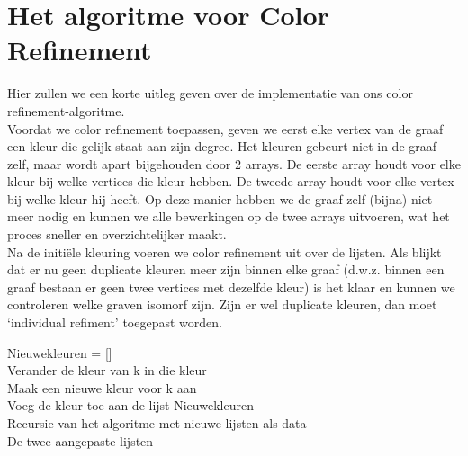 \documentclass{article}
\begin{document}

\section{Het algoritme voor Color Refinement}
Hier zullen we een korte uitleg geven over de implementatie van ons color refinement-algoritme.\\



Voordat we color refinement toepassen, geven we eerst elke vertex van de graaf een kleur die gelijk staat aan zijn degree. Het kleuren gebeurt niet in de graaf zelf, maar wordt apart bijgehouden door 2 arrays. De eerste array houdt voor elke kleur bij welke vertices die kleur hebben. De tweede array houdt voor elke vertex bij welke kleur hij heeft. Op deze manier hebben we de graaf zelf (bijna) niet meer nodig en kunnen we alle bewerkingen op de twee arrays uitvoeren, wat het proces sneller en overzichtelijker maakt.\\
Na de initi\"ele kleuring voeren we color refinement uit over de lijsten. Als blijkt dat er nu geen duplicate kleuren meer zijn binnen elke graaf (d.w.z. binnen een graaf bestaan er geen twee vertices met dezelfde kleur) is het klaar en kunnen we controleren welke graven isomorf zijn. Zijn er wel duplicate kleuren, dan moet `individual refiment' toegepast worden.\\
\begin{algorithm}[H]
			Nieuwekleuren = []\\
						Verander de kleur van k in die kleur\\
					\Else
						Maak een nieuwe kleur voor k aan\\
						Voeg de kleur toe aan de lijst Nieuwekleuren\\
		Recursie van het algoritme met nieuwe lijsten als data\\
	\Return De twee aangepaste lijsten
\end{algorithm}
\end{document}
